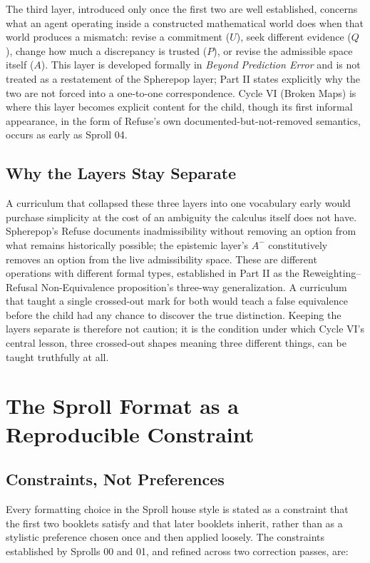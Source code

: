 \documentclass[11pt,twoside]{book}
\begin{document}
The third layer, introduced only once the first two are well established, concerns what an agent operating inside a constructed mathematical world does when that world produces a mismatch: revise a commitment ($U$), seek different evidence ($Q$), change how much a discrepancy is trusted ($P$), or revise the admissible space itself ($A$). This layer is developed formally in \emph{Beyond Prediction Error} and is not treated as a restatement of the Spherepop layer; Part II states explicitly why the two are not forced into a one-to-one correspondence. Cycle VI (Broken Maps) is where this layer becomes explicit content for the child, though its first informal appearance, in the form of Refuse's own documented-but-not-removed semantics, occurs as early as Sproll 04.

\section{Why the Layers Stay Separate}

A curriculum that collapsed these three layers into one vocabulary early would purchase simplicity at the cost of an ambiguity the calculus itself does not have. Spherepop's Refuse documents inadmissibility without removing an option from what remains historically possible; the epistemic layer's $A^-$ constitutively removes an option from the live admissibility space. These are different operations with different formal types, established in Part II as the Reweighting--Refusal Non-Equivalence proposition's three-way generalization. A curriculum that taught a single crossed-out mark for both would teach a false equivalence before the child had any chance to discover the true distinction. Keeping the layers separate is therefore not caution; it is the condition under which Cycle VI's central lesson, three crossed-out shapes meaning three different things, can be taught truthfully at all.

\chapter{The Sproll Format as a Reproducible Constraint}

\section{Constraints, Not Preferences}

Every formatting choice in the Sproll house style is stated as a constraint that the first two booklets satisfy and that later booklets inherit, rather than as a stylistic preference chosen once and then applied loosely. The constraints established by Sprolls 00 and 01, and refined across two correction passes, are:
\end{document}
